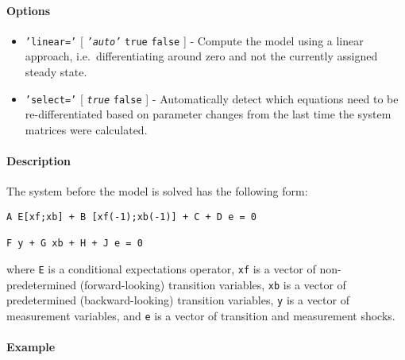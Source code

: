 \paragraph{Options}

\begin{itemize}
\item
  \texttt{'linear='} {[} \emph{\texttt{'auto'}} \textbar{} \texttt{true}
  \textbar{} \texttt{false} {]} - Compute the model using a linear
  approach, i.e.~differentiating around zero and not the currently
  assigned steady state.
\item
  \texttt{'select='} {[} \emph{\texttt{true}} \textbar{} \texttt{false}
  {]} - Automatically detect which equations need to be
  re-differentiated based on parameter changes from the last time the
  system matrices were calculated.
\end{itemize}

\paragraph{Description}

The system before the model is solved has the following form:

\begin{verbatim}
A E[xf;xb] + B [xf(-1);xb(-1)] + C + D e = 0

F y + G xb + H + J e = 0
\end{verbatim}

where \texttt{E} is a conditional expectations operator, \texttt{xf} is
a vector of non-predetermined (forward-looking) transition variables,
\texttt{xb} is a vector of predetermined (backward-looking) transition
variables, \texttt{y} is a vector of measurement variables, and
\texttt{e} is a vector of transition and measurement shocks.

\paragraph{Example}



